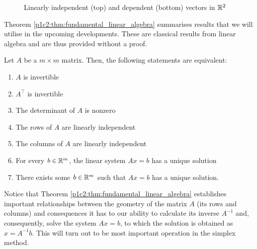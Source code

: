 \begin{figure}[h]
	\centering
	\caption{Linearly independent (top) and dependent (bottom) vectors in $\mathbb{R}^2$}
\end{figure}

Theorem \ref{p1c2:thm:fundamental_linear_algebra} summarises results that we will utilise in the upcoming developments. These are classical results from linear algebra and are thus provided without a proof.
%
\begin{theorem}[Inverses, linear independence, and solving $Ax = b$] \label{p1c2:thm:fundamental_linear_algebra}
	Let $A$ be a $m \times m$ matrix. Then, the following statements are equivalent:
	\begin{enumerate}
		\item $A$ is invertible
		\item $A^\top$ is invertible
		\item The determinant of $A$ is nonzero
		\item The rows of $A$ are linearly independent
		\item The columns of $A$ are linearly independent
		\item For every $b \in \mathbb{R}^m$, the linear system $Ax = b$ has a unique solution
		\item There exists some $b \in \mathbb{R}^m$ such that $Ax = b$ has a unique solution.	
	\end{enumerate}	
\end{theorem}
%
Notice that Theorem \ref{p1c2:thm:fundamental_linear_algebra} establishes important relationships between the geometry of the matrix $A$ (its rows and columns) and consequences it has to our ability to calculate its inverse $A^{-1}$ and, consequently, solve the system $Ax = b$, to which the solution is obtained as $x = A^{-1}b$. This will turn out to be most important operation in the simplex method.


